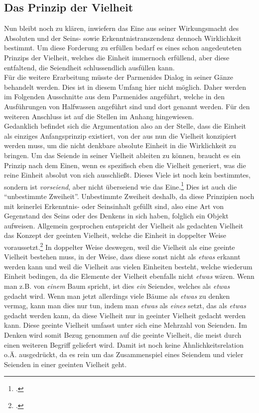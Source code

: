 \subsection{Das Prinzip der Vielheit}
Nun bleibt noch zu klären, inwiefern das Eine aus seiner Wirkungsmacht des Absoluten und der Seins- sowie Erkenntnistranszendenz dennoch Wirklichkeit bestimmt. Um diese Forderung zu erfüllen bedarf es eines schon angedeuteten Prinzips der Vielheit, welches die Einheit immernoch erfüllend, aber diese entfaltend, die Seiendheit schlussendlich ausfüllen kann.\\
Für die weitere Erarbeitung müsste der Parmenides Dialog in seiner Gänze behandelt werden. Dies ist in diesem Umfang hier nicht möglich. Daher werden im Folgenden Ausschnitte aus dem Parmenides angeführt, welche in den Ausführungen von Halfwassen angeführt sind und dort genannt werden. Für den weiteren Anschluss ist auf die Stellen im Anhang hingewiesen.\\ 
Gedanklich befindet sich die Argumentation also an der Stelle, dass die Einheit als einziges Anfangsprinzip existiert, von der aus nun die Vielheit konzipiert werden muss, um die nicht denkbare absolute Einheit in die Wirklichkeit zu bringen. Um das Seiende in seiner Vielheit ableiten zu können, braucht es ein Prinzip nach dem Einen, wenn es spezifisch eben die Vielheit generiert, was die reine Einheit absolut von sich ausschließt. Dieses Viele ist noch kein bestimmtes, sondern ist \emph{vorseiend}, aber nicht überseiend wie das Eine.\footcite[vgl.][S. 103]{halfwassen2015spuren} Dies ist auch die \enquote{unbestimmte Zweiheit}. Unbestimmte Zweiheit deshalb, da diese Prinzipien noch mit keinerlei Erkenntnis- oder Seinsinhalt gefüllt sind, also eine Art von Gegenstand des Seins oder des Denkens in sich haben, folglich ein Objekt aufweisen.
Allgemein gesprochen entspricht der Vielheit als gedachten Vielheit das Konzept der geeinten Vielheit, welche die Einheit in doppelter Weise voraussetzt.\footcite[vgl.][S. 97]{halfwassen2015spuren}
In doppelter Weise deswegen, weil die Vielheit als eine geeinte Vielheit bestehen muss, in der Weise, dass diese sonst nicht als \emph{etwas} erkannt werden kann und weil die Vielheit aus vielen Einheiten besteht, welche wiederum Einheit bedingen, da die Elemente der Vielheit ebenfalls nicht \emph{etwas} wären. Wenn man z.B. von \emph{einem} Baum spricht, ist dies \emph{ein} Seiendes, welches als \emph{etwas} gedacht wird. Wenn man jetzt allerdings viele Bäume als \emph{etwas} zu denken vermag, kann man dies nur tun, indem man \emph{etwas} als \emph{eines} setzt, das als \emph{etwas} gedacht werden kann, da diese Vielheit nur in geeinter Vielheit gedacht werden kann. Diese geeinte Vielheit umfasst unter sich eine Mehrzahl von Seienden. Im Denken wird somit Bezug genommen auf die geeinte Vielheit, die meist durch einen weiteren Begriff geliefert wird. Damit ist noch keine Ähnlichkeitsrelation o.Ä. ausgedrückt, da es rein um das Zusammenspiel eines Seiendem und vieler Seienden in einer geeinten Vielheit geht. 
